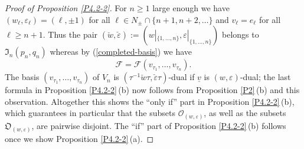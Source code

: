 \documentclass{amsart}
\theoremstyle{definition}
\newcommand{\bs}[1]{\boldsymbol{#1}}
\begin{document}
\begin{proof}[Proof of Proposition \ref{P4.2-2}]
For $n\geq 1$ large enough we have
$(w_\ell,\varepsilon_\ell)=(\ell,\pm1)$ for all $\ell\in N_\pm\cap\{n+1,n+2,\ldots\}$
and $v_\ell=e_\ell$ for all $\ell\geq n+1$.
Thus the pair $(\check{w},\check{\varepsilon}):=(w|_{\{1,\ldots,n\}},\varepsilon|_{\{1,\ldots,n\}})$ belongs to $\mathfrak{I}_n(p_n,q_n)$
whereas by (\ref{completed-basis}) we have
\[\mathcal{F}=\mathcal{F}(v_{\tau_1},\ldots,v_{\tau_n}).\]
The basis $(v_{\tau_1},\ldots,v_{\tau_n})$ of $V_n$ is $(\tau^{-1}\check{w}\tau,\check{\varepsilon}\tau)$-dual if $\underline{v}$ is $(w,\varepsilon)$-dual; the last formula in Proposition \ref{P4.2-2}\,{\rm (b)} now follows from Proposition \ref{P2}\,{\rm (b)} and this observation. Altogether this shows the ``only if'' part in 
Proposition \ref{P4.2-2}\,{\rm (b)}, which guarantees in particular that the subsets $\bs{\mathcal{O}}_{(w,\varepsilon)}$, as well as the subsets $\bs{\mathfrak{O}}_{(w,\varepsilon)}$,
are pairwise disjoint.
The ``if'' part of Proposition \ref{P4.2-2}\,{\rm (b)} follows once we show 
Proposition \ref{P4.2-2}\,{\rm (a)}.


\end{proof}
\end{document}
